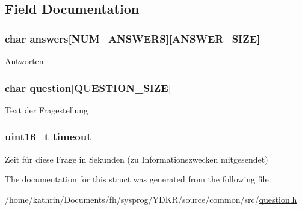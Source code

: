 \subsection{Field Documentation}
\hypertarget{struct_question_message_aee7134a1e311755686d480c3f8b963c7}{
\subsubsection[{answers}]{\setlength{\rightskip}{0pt plus 5cm}char {\bf answers}\mbox{[}NUM\_\-ANSWERS\mbox{]}\mbox{[}ANSWER\_\-SIZE\mbox{]}}}
\label{struct_question_message_aee7134a1e311755686d480c3f8b963c7}
Antworten \hypertarget{struct_question_message_a4b07688ced7937f6eb270f34c6870281}{
\subsubsection[{question}]{\setlength{\rightskip}{0pt plus 5cm}char {\bf question}\mbox{[}QUESTION\_\-SIZE\mbox{]}}}
\label{struct_question_message_a4b07688ced7937f6eb270f34c6870281}
Text der Fragestellung \hypertarget{struct_question_message_a7f1ad43d3bf79b40bc39dbb5a6c3a5ae}{
\subsubsection[{timeout}]{\setlength{\rightskip}{0pt plus 5cm}uint16\_\-t {\bf timeout}}}
\label{struct_question_message_a7f1ad43d3bf79b40bc39dbb5a6c3a5ae}
Zeit für diese Frage in Sekunden (zu Informationszwecken mitgesendet) 

The documentation for this struct was generated from the following file:\begin{DoxyCompactItemize}
\item 
/home/kathrin/Documents/fh/sysprog/YDKR/source/common/src/\hyperlink{question_8h}{question.h}\end{DoxyCompactItemize}
